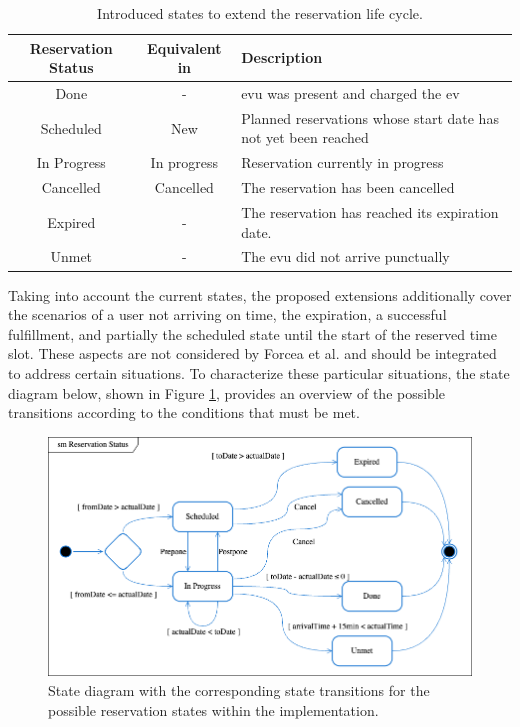 \begingroup
\setlength{\tabcolsep}{10pt} %
\renewcommand{\arraystretch}{1.5} %
\begin{table}[h]
    \centering
    \caption{Introduced states to extend the reservation life cycle.}
    \begin{tabular}{c|c|m{7cm}}
        Reservation Status & Equivalent in \cite{flocea_electric_2022} & Description \\ \hline
        Done & - & \acrshort{evu} was present and charged the \acrshort{ev} \\
        Scheduled & New & Planned reservations whose start date has not yet been reached \\
        In Progress & In progress & Reservation currently in progress \\
        Cancelled & Cancelled & The reservation has been cancelled \\
        Expired & - & The reservation has reached its expiration date. \\
        Unmet & - & The \acrshort{evu} did not arrive punctually
    \end{tabular}
    \label{tab:reservation-states}
\end{table}
\endgroup

\noindent Taking into account the current states, the proposed extensions additionally cover the scenarios of a user not arriving on time, the expiration, a successful fulfillment, and partially the scheduled state until the start of the reserved time slot. 
These aspects are not considered by Forcea et al. and should be integrated to address certain situations.
To characterize these particular situations, the state diagram below, shown in Figure \ref{fig:reservation-states}, provides an overview of the possible transitions according to the conditions that must be met.

\begin{figure}[h]
    \centering
    \includegraphics[scale=0.4]{resources/images/main/5_design/ReservationStatusStates.png}
    \caption{State diagram with the corresponding state transitions for the possible reservation states within the implementation.}
    \label{fig:reservation-states}
\end{figure}

